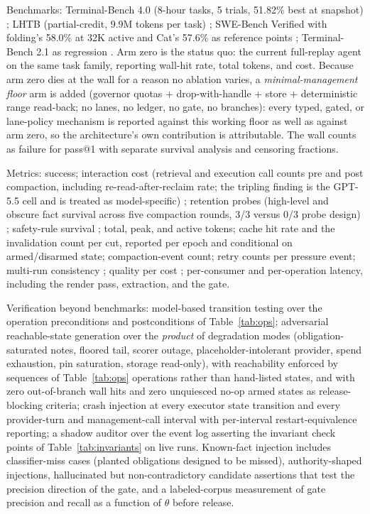 \documentclass[11pt]{article}
\begin{document}
Benchmarks: Terminal-Bench 4.0 (8-hour tasks, 5 trials, 51.82\% best at snapshot) \cite{tb42026}; LHTB (partial-credit, 9.9M tokens per task) \cite{lhtb2026}; SWE-Bench Verified with folding's 58.0\% at 32K active and Cat's 57.6\% as reference points \cite{folding2026,cat2026}; Terminal-Bench 2.1 as regression \cite{tb32026}. Arm zero is the status quo: the current full-replay agent on the same task family, reporting wall-hit rate, total tokens, and cost. Because arm zero dies at the wall for a reason no ablation varies, a \emph{minimal-management floor} arm is added (governor quotas + drop-with-handle + store + deterministic range read-back; no lanes, no ledger, no gate, no branches): every typed, gated, or lane-policy mechanism is reported against this working floor as well as against arm zero, so the architecture's own contribution is attributable. The wall counts as failure for pass@1 with separate survival analysis and censoring fractions.

Metrics: success; interaction cost (retrieval and execution call counts pre and post compaction, including re-read-after-reclaim rate; the tripling finding is the GPT-5.5 cell and is treated as model-specific) \cite{interact2026}; retention probes (high-level and obscure fact survival across five compaction rounds, 3/3 versus 0/3 probe design) \cite{anthropic2026cookbook,cliff2026}; safety-rule survival \cite{cliff2026}; total, peak, and active tokens; cache hit rate and the invalidation count per cut, reported per epoch and conditional on armed/disarmed state; compaction-event count; retry counts per pressure event; multi-run consistency \cite{trace2026}; quality per cost \cite{memorycpt2026}; per-consumer and per-operation latency, including the render pass, extraction, and the gate.

Verification beyond benchmarks: model-based transition testing over the operation preconditions and postconditions of Table~\ref{tab:ops}; adversarial reachable-state generation over the \emph{product} of degradation modes (obligation-saturated notes, floored tail, scorer outage, placeholder-intolerant provider, spend exhaustion, pin saturation, storage read-only), with reachability enforced by sequences of Table~\ref{tab:ops} operations rather than hand-listed states, and with zero out-of-branch wall hits and zero unquiesced no-op armed states as release-blocking criteria; crash injection at every executor state transition and every provider-turn and management-call interval with per-interval restart-equivalence reporting; a shadow auditor over the event log asserting the invariant check points of Table~\ref{tab:invariants} on live runs. Known-fact injection includes classifier-miss cases (planted obligations designed to be missed), authority-shaped injections, hallucinated but non-contradictory candidate assertions that test the precision direction of the gate, and a labeled-corpus measurement of gate precision and recall as a function of $\theta$ before release.
\end{document}
